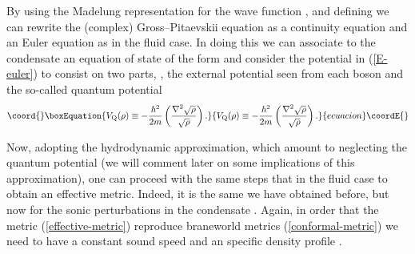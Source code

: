 \documentclass[a4paper,prl,showpacs,twocolumn]{revtex4}
\begin{document}
By using the Madelung representation 
for the wave function
\coordHE{},
and defining \coordHE{}
we can rewrite the (complex) Gross--Pitaevskii equation 
as a continuity equation and an Euler equation as in the fluid case.
In doing this we can associate to the condensate an
equation of state of the form \coordHE{}
and consider the potential \myHighlight{$\Phi$}\coordHE{} in (\ref{E-euler}) to consist on 
two parts, \coordHE{},
the external potential seen from each boson
and the so-called quantum potential 
%
\begin{equation}\coord{}\boxEquation{
V_{\rm Q}(\rho) \equiv  - {\hbar^2 \over 2 m} 
\left( {\nabla^2 \sqrt\rho\over\sqrt\rho} \right).
\label{quantum-potential}
}{
V_{\rm Q}(\rho) \equiv  - {\hbar^2 \over 2 m} 
\left( {\nabla^2 \sqrt\rho\over\sqrt\rho} \right).
}{ecuacion}\coordE{}\end{equation}
%

Now, adopting the hydrodynamic approximation, which amount to
neglecting the quantum potential (we will comment later on some implications
of this approximation), one can proceed with the same steps
that in the fluid case to obtain an effective metric. 
Indeed, it is the same we have obtained before, but now for the sonic 
perturbations in the condensate \cite{garay,barcelo}. 
Again, in order that the 
metric (\ref{effective-metric}) reproduce braneworld metrics 
(\ref{conformal-metric}) we need to have a constant sound speed \coordHE{}
and an specific density profile \coordHE{}.
\end{document}
